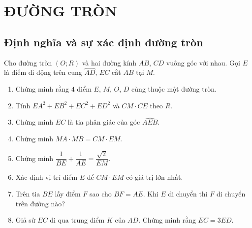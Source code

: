 \chapter{ĐƯỜNG TRÒN}

\section{Định nghĩa và sự xác định đường tròn}

\begin{bt}%
	Cho đường tròn $ (O;R) $ và hai đường kính $ AB $, $ CD $ vuông góc với nhau. Gọi $ E $ là điểm di động trên cung $ \wideparen{AD} $, $ EC $ cắt $ AB $ tại $ M $.
	\begin{enumerate}
		\item Chứng minh rằng $ 4 $ điểm $ E $, $ M $, $ O $, $ D $ cùng thuộc một đường tròn.
		\item Tính $ EA^{2}+EB^{2}+EC^{2}+ED^{2} $ và $CM\cdot CE $ theo $ R $.
		\item Chứng minh $ EC $ là tia phân giác của góc $ \widehat{AEB} $.
		\item Chứng minh $ MA\cdot MB=CM\cdot EM $.
		\item Chứng minh $ \dfrac{1}{BE}+\dfrac{1}{AE}=\dfrac{\sqrt{2}}{EM} $.
		\item Xác định vị trí điểm $ E $ để $ CM\cdot EM $ có giá trị lớn nhất.
		\item Trên tia $ BE $ lấy điểm $ F $ sao cho $ BF=AE $. Khi $ E $ di chuyển thì $ F $ di chuyển trên đường nào?
		\item Giả sử $ EC $ đi qua trung điểm $ K $ của $ AD $. Chứng minh rằng $ EC=3ED $.
	\end{enumerate}
\end{bt}
